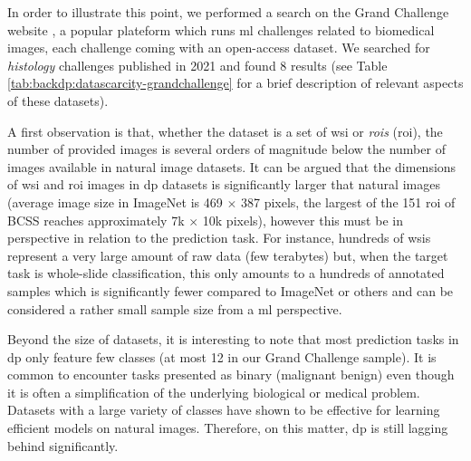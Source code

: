 In order to illustrate this point, we performed a search on the Grand Challenge website \parencite{grandchallenge}, a popular plateform which runs \acrlong{ml} challenges related to biomedical images, each challenge coming with an open-access dataset. We searched for \textit{histology} challenges published in 2021 and found 8 results (see Table \ref{tab:backdp:datascarcity-grandchallenge} for a brief description of relevant aspects of these datasets).

A first observation is that, whether the dataset is a set of \acrshort{wsi} or \textit{\acrlong{roi}s} (\acrshort{roi}), the number of provided images is several orders of magnitude below the number of images available in natural image datasets. It can be argued that the dimensions of \acrshort{wsi} and \acrshort{roi} images in \acrlong{dp} datasets is significantly larger that natural images (\eg average image size in ImageNet is 469 $\times$ 387 pixels, the largest of the 151 \acrshort{roi} of BCSS reaches approximately 7k $\times$ 10k pixels), however this must be in perspective in relation to the prediction task. For instance, hundreds of \acrshort{wsi}s represent a very large amount of raw data (\eg few terabytes) but, when the target task is whole-slide classification, this only amounts to a hundreds of annotated samples which is significantly fewer compared to ImageNet or others and can be considered a rather small sample size from a \acrshort{ml} perspective.  

Beyond the size of datasets, it is interesting to note that most prediction tasks in \acrlong{dp} only feature few classes (at most 12 in our Grand Challenge sample). It is common to encounter tasks presented as binary (\eg malignant \vs benign) even though it is often a simplification of the underlying biological or medical problem. Datasets with a large variety of classes have shown to be effective for learning efficient models on natural images. Therefore, on this matter, \acrlong{dp} is still lagging behind significantly. 


